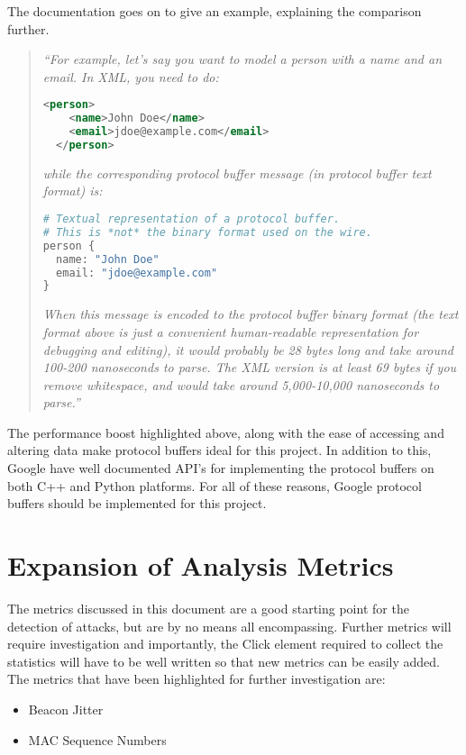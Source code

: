 The documentation goes on to give an example, explaining the comparison further.
\begin{quote}
\textit{``For example, let's say you want to model a person with a name and an email. In XML, you need to do:}
\begin{lstlisting}[language=XML]
  <person>
    <name>John Doe</name>
    <email>jdoe@example.com</email>
  </person>
\end{lstlisting}
\textit{while the corresponding protocol buffer message (in protocol buffer text format) is:}
\begin{lstlisting}[language=Python]
# Textual representation of a protocol buffer.
# This is *not* the binary format used on the wire.
person {
  name: "John Doe"
  email: "jdoe@example.com"
}
\end{lstlisting}
\textit{
When this message is encoded to the protocol buffer binary format (the text format above is just a convenient human-readable representation for debugging and editing), it would probably be 28 bytes long and take around 100-200 nanoseconds to parse. The XML version is at least 69 bytes if you remove whitespace, and would take around 5,000-10,000 nanoseconds to parse.''}
\end{quote}

The performance boost highlighted above, along with the ease of accessing and altering data make protocol buffers ideal for this project. In addition to this, Google have well documented API's for implementing the protocol buffers on both C++ and Python platforms. For all of these reasons, Google protocol buffers should be implemented for this project.

\section{Expansion of Analysis Metrics}

The metrics discussed in this document are a good starting point for the detection of attacks, but are by no means all encompassing. Further metrics will require investigation and importantly, the Click element required to collect the statistics will have to be well written so that new metrics can be easily added. The metrics that have been highlighted for further investigation are:
\begin{itemize}
 \item Beacon Jitter
 \item MAC Sequence Numbers 
\end{itemize}

